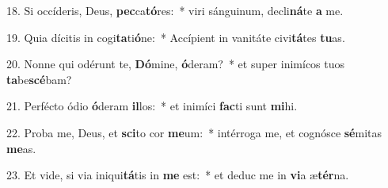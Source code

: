 18. Si occíderis, Deus, \textbf{pec}ca\textbf{tó}res:~*  viri sánguinum, decli\textbf{ná}te \textbf{a} me.\

19. Quia dícitis in cogi\textbf{ta}ti\textbf{ó}ne:~*  Accípient in vanitáte civi\textbf{tá}tes \textbf{tu}as.\

20. Nonne qui odérunt te, \textbf{Dó}mine, \textbf{ó}deram?~*  et super inimícos tuos \textbf{ta}be\textbf{scé}bam?\

21. Perfécto ódio \textbf{ó}deram \textbf{il}los:~*  et inimíci \textbf{fac}ti sunt \textbf{mi}hi.\

22. Proba me, Deus, et \textbf{sci}to cor \textbf{me}um:~*  intérroga me, et cognósce \textbf{sé}mitas \textbf{me}as.\

23. Et vide, si via iniqui\textbf{tá}tis in \textbf{me} est:~*  et deduc me in \textbf{vi}a æ\textbf{tér}na.\

